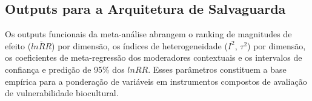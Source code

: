 \subsection{Outputs para a Arquitetura de Salvaguarda}

Os outputs funcionais da meta-análise abrangem o ranking de magnitudes de efeito ($\overline{lnRR}$) por dimensão, os índices de heterogeneidade ($I^2$, $\tau^2$) por dimensão, os coeficientes de meta-regressão dos moderadores contextuais e os intervalos de confiança e predição de 95\% dos $lnRR$. Esses parâmetros constituem a base empírica para a ponderação de variáveis em instrumentos compostos de avaliação de vulnerabilidade biocultural.
